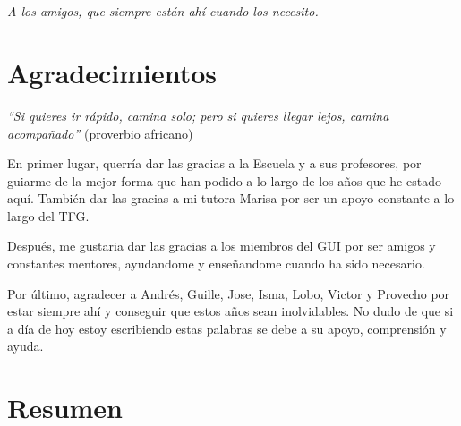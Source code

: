 \documentclass[openright,twoside,10pt]{book}
\begin{document}
    \newpage
    \mbox{}	
    \thispagestyle{empty} %

    \chapter*{}

    \begin{flushright}
        \textit{%
        A los amigos, que siempre están ahí cuando los necesito.}
    \end{flushright}

    \chapter*{Agradecimientos} %

    \emph{``Si quieres ir rápido, camina solo; pero si quieres llegar lejos,
    camina acompañado''} (proverbio africano)
    
    En primer lugar, querría dar las gracias a la Escuela y a sus
    profesores, por guiarme de la mejor forma que han podido a lo largo de
    los años que he estado aquí. También dar las gracias a mi tutora Marisa
    por ser un apoyo constante a lo largo del TFG.
    
    Después, me gustaria dar las gracias a los miembros del GUI por ser
    amigos y constantes mentores, ayudandome y enseñandome cuando ha sido
    necesario.
    
    Por último, agradecer a Andrés, Guille, Jose, Isma, Lobo, Victor y
    Provecho por estar siempre ahí y conseguir que estos años sean
    inolvidables. No dudo de que si a día de hoy estoy escribiendo estas
    palabras se debe a su apoyo, comprensión y ayuda.

    \chapter*{Resumen} %
\end{document}
